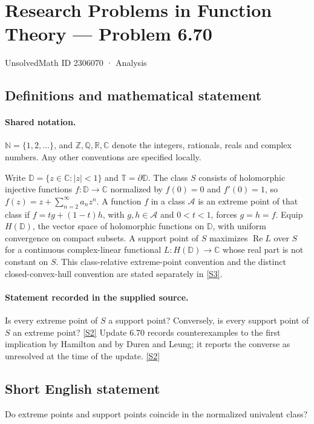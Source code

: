 \documentclass[11pt]{article}
\newcommand{\sref}[2]{\hyperlink{source:#1:#2}{[S#2]}}
\begin{document}
\setcounter{section}{2306069}
\section{Research Problems in Function Theory — Problem 6.70}\label{2306070}
{\small\sffamily UnsolvedMath ID 2306070 · Analysis}
\subsection{Definitions and mathematical statement}

\paragraph{Shared notation.}$\mathbb N=\{1,2,\ldots\}$, and $\mathbb Z,\mathbb Q,\mathbb R,\mathbb C$ denote the integers, rationals, reals and complex numbers. Any other conventions are specified locally.


Write $\mathbb D=\{z\in\mathbb C:|z|<1\}$ and $\mathbb T=\partial\mathbb D$. The class $S$ consists of holomorphic injective functions $f:\mathbb D\to\mathbb C$ normalized by $f(0)=0$ and $f'(0)=1$, so $f(z)=z+\sum_{n=2}^{\infty}a_nz^n$. A function $f$ in a class $\mathcal A$ is an extreme point of that class if $f=tg+(1-t)h$, with $g,h\in\mathcal A$ and $0<t<1$, forces $g=h=f$. Equip $H(\mathbb D)$, the vector space of holomorphic functions on $\mathbb D$, with uniform convergence on compact subsets. A support point of $S$ maximizes $\operatorname{Re}L$ over $S$ for a continuous complex-linear functional $L:H(\mathbb D)\to\mathbb C$ whose real part is not constant on $S$.  This class-relative extreme-point convention and the distinct closed-convex-hull convention are stated separately in \sref{2306070}{3}.
\paragraph{Statement recorded in the supplied source.}
Is every extreme point of $S$ a support point? Conversely, is every support point of $S$ an extreme point? \sref{2306070}{2}
Update 6.70 records counterexamples to the first implication by Hamilton and by Duren and Leung; it reports the converse as unresolved at the time of the update. \sref{2306070}{2}
\subsection{Short English statement}
Do extreme points and support points coincide in the normalized univalent class?
\end{document}
